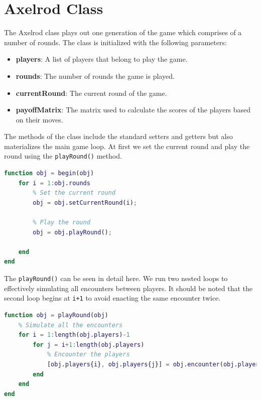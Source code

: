 \documentclass[12pt]{article}
\begin{document}
\section{Axelrod Class}
The Axelrod class plays out one generation of the game which comprises of a number of rounds. The class is initialized with the following parameters:
\begin{itemize}
    \item \textbf{players}: A list of players that belong to  play the game.
    \item \textbf{rounds}: The number of rounds the game is played.
    \item \textbf{currentRound}: The current round of the game.
    \item \textbf{payoffMatrix}: The matrix used to calculate the scores of the players based on their moves.
\end{itemize}
The methods of the class include the standard setters and getters but also materializes the main game loop. At first we set the current round and play the round using the \texttt{playRound()} method.
\begin{lstlisting}[language=Matlab, caption={Full Rounding Logic Implementation}]
% Method to play the tournament
function obj = begin(obj)
    for i = 1:obj.rounds
        % Set the current round
        obj = obj.setCurrentRound(i);

        % Play the round
        obj = obj.playRound();

    end
end
\end{lstlisting}

The \texttt{playRound()} can be seen in detail here. We run two nested loops to effectively simulating all encounters between players. It should be noted that the second loop begins at \texttt{i+1} to avoid enacting the same encounter twice.

\begin{lstlisting}[language=Matlab, caption={Full Rounding Logic Implementation}]
% Method to play a round
function obj = playRound(obj)
    % Simulate all the encounters
    for i = 1:length(obj.players)-1
        for j = i+1:length(obj.players)
            % Encounter the players
            [obj.players{i}, obj.players{j}] = obj.encounter(obj.players{i}, obj.players{j}, obj.getCurrentRound());
        end
    end
end
\end{lstlisting}
\end{document}
